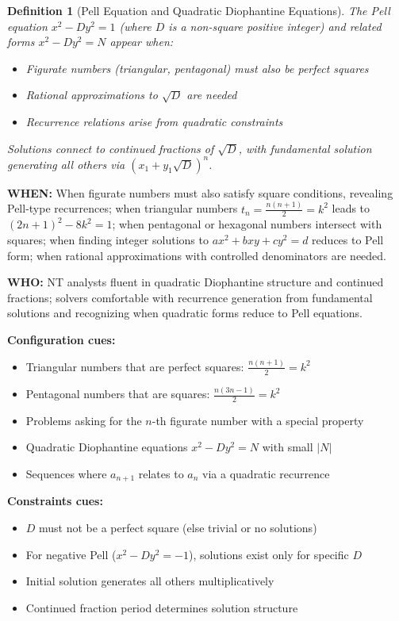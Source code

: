 \documentclass[12pt]{article}
\newtheorem{definition}{Definition}[section]
\begin{document}
\begin{definition}[Pell Equation and Quadratic Diophantine Equations]
The Pell equation $x^2 - Dy^2 = 1$ (where $D$ is a non-square positive integer) and related forms $x^2 - Dy^2 = N$ appear when:
\begin{itemize}
    \item Figurate numbers (triangular, pentagonal) must also be perfect squares
    \item Rational approximations to $\sqrt{D}$ are needed
    \item Recurrence relations arise from quadratic constraints
\end{itemize}
Solutions connect to continued fractions of $\sqrt{D}$, with fundamental solution generating all others via $(x_1 + y_1\sqrt{D})^n$.
\end{definition}

\textbf{WHEN:} When figurate numbers must also satisfy square conditions, revealing Pell-type recurrences; when triangular numbers $t_n = \frac{n(n+1)}{2} = k^2$ leads to $(2n+1)^2 - 8k^2 = 1$; when pentagonal or hexagonal numbers intersect with squares; when finding integer solutions to $ax^2 + bxy + cy^2 = d$ reduces to Pell form; when rational approximations with controlled denominators are needed.

\textbf{WHO:} NT analysts fluent in quadratic Diophantine structure and continued fractions; solvers comfortable with recurrence generation from fundamental solutions and recognizing when quadratic forms reduce to Pell equations.

\textbf{Configuration cues:}
\begin{itemize}
    \item Triangular numbers that are perfect squares: $\frac{n(n+1)}{2} = k^2$
    \item Pentagonal numbers that are squares: $\frac{n(3n-1)}{2} = k^2$
    \item Problems asking for the $n$-th figurate number with a special property
    \item Quadratic Diophantine equations $x^2 - Dy^2 = N$ with small $|N|$
    \item Sequences where $a_{n+1}$ relates to $a_n$ via a quadratic recurrence
\end{itemize}

\textbf{Constraints cues:}
\begin{itemize}
    \item $D$ must not be a perfect square (else trivial or no solutions)
    \item For negative Pell ($x^2 - Dy^2 = -1$), solutions exist only for specific $D$
    \item Initial solution generates all others multiplicatively
    \item Continued fraction period determines solution structure
\end{itemize}
\end{document}
